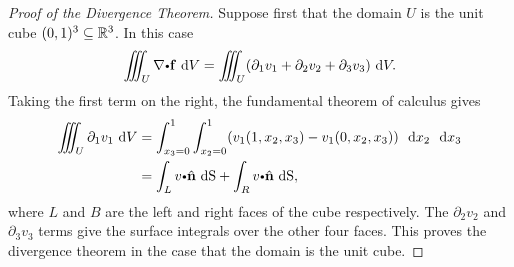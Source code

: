   \begin{proof}[Proof of the Divergence Theorem]
    Suppose first that the domain $U$ is the unit cube $(0, 1)^3 \subseteq \mathbb{R}^3$.
    In this case
    \begin{equation*}
      \diiint_U \grad \bp \vector{f} \, \d V
	= \diiint_U (\partial_1 v_1 + \partial_2 v_2 + \partial_3 v_3) \, \d V.
    \end{equation*}
    Taking the first term on the right, the fundamental theorem of calculus gives
    \begin{align*}
      \diiint_U \partial_1 v_1 \, \d V
	&= \dint_{x_3 = 0}^1 \dint_{x_2 = 0}^1 ( v_1(1, x_2, x_3) - v_1( 0, x_2, x_3) ) \, \dx_2 \, \dx_3
	\\
	&= \dint_L v \bp \hat{ \vector{n}} \,   \d \S+ \dint_R v \bp \hat{ \vector{n}} \,  \d \S,
    \end{align*}
    where $L$ and $B$ are the left and right faces of the cube respectively.
    The $\partial_2 v_2$ and $\partial_3 v_3$ terms give the surface integrals over the other four faces.
    This proves the divergence theorem in the case that the domain is the unit cube.

  \end{proof}


